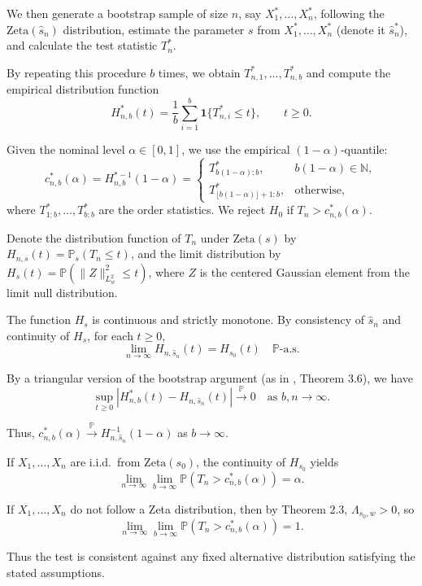 \documentclass{article}
\theoremstyle{thm}
\theoremstyle{def}
\begin{document}
We then generate a bootstrap sample of size $n$, say $X_1^*,\ldots,X_n^*$, following the
$\mathrm{Zeta}(\widehat{s}_n)$ distribution, estimate the parameter $s$ from $X_1^*,\ldots,X_n^*$
(denote it $\widehat{s}_n^*$), and calculate the test statistic $T_n^*$.

By repeating this procedure $b$ times, we obtain $T_{n,1}^*,\ldots,T_{n,b}^*$ and compute
the empirical distribution function
\[
H_{n,b}^*(t)=\frac{1}{b}\sum_{i=1}^b\mathbf{1}\{T_{n,i}^*\le t\},\qquad t\ge 0.
\]

Given the nominal level $\alpha\in[0,1]$, we use the empirical $(1-\alpha)$-quantile:
\[
c_{n,b}^*(\alpha)=H_{n,b}^{*-1}(1-\alpha)=\begin{cases}
T_{b(1-\alpha):b}^*, & b(1-\alpha)\in\mathbb{N},\\[0.2em]
T_{\lfloor b(1-\alpha)\rfloor+1:b}^*, & \text{otherwise,}
\end{cases}
\]
where $T_{1:b}^*,\ldots,T_{b:b}^*$ are the order statistics. We reject $H_0$ if $T_n>c_{n,b}^*(\alpha)$.

Denote the distribution function of $T_n$ under $\mathrm{Zeta}(s)$ by
$H_{n,s}(t)=\mathbb{P}_s(T_n\le t)$, and the limit distribution by
$H_s(t)=\mathbb{P}(\|Z\|_{L^2_w}^2\le t)$, where $Z$ is the centered Gaussian element
from the limit null distribution.

The function $H_s$ is continuous and strictly monotone. By consistency of $\widehat{s}_n$
and continuity of $H_s$, for each $t\ge 0$,
\[
\lim_{n\to\infty}H_{n,\widehat{s}_n}(t)=H_{s_0}(t)\quad\mathbb{P}\text{-a.s.}
\]

By a triangular version of the bootstrap argument (as in \cite{H:1996}, Theorem 3.6), we have
\[
\sup_{t\ge 0}\left|H_{n,b}^*(t)-H_{n,\widehat{s}_n}(t)\right|\xrightarrow{\mathbb{P}}0
\quad\text{as }b,n\to\infty.
\]

Thus, $c_{n,b}^*(\alpha)\xrightarrow{\mathbb{P}}H_{n,\widehat{s}_n}^{-1}(1-\alpha)$ as $b\to\infty$.

If $X_1,\ldots,X_n$ are i.i.d.\ from $\mathrm{Zeta}(s_0)$, the continuity of $H_{s_0}$ yields
\[
\lim_{n\to\infty}\lim_{b\to\infty}\mathbb{P}(T_n>c_{n,b}^*(\alpha))=\alpha.
\]

If $X_1,\ldots,X_n$ do not follow a Zeta distribution, then by Theorem 2.3,
$\Lambda_{s_0,w}>0$, so
\[
\lim_{n\to\infty}\lim_{b\to\infty}\mathbb{P}(T_n>c_{n,b}^*(\alpha))=1.
\]

Thus the test is consistent against any fixed alternative distribution satisfying
the stated assumptions.
\end{document}
